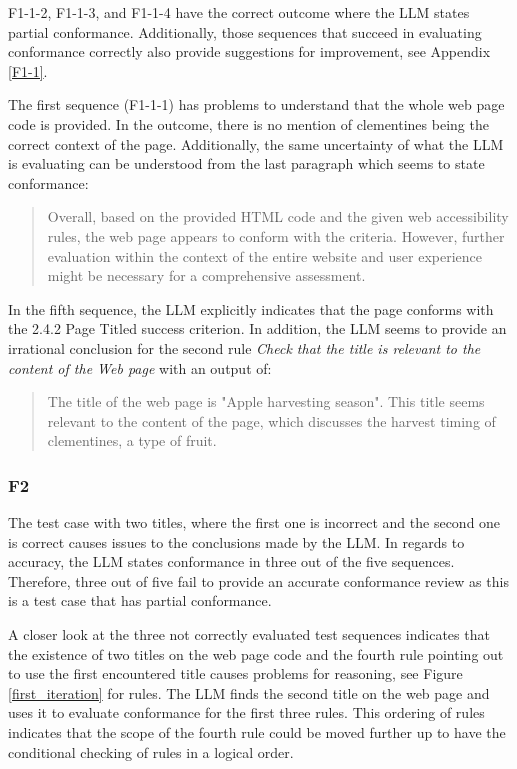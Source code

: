 F1-1-2, F1-1-3, and F1-1-4 have the correct outcome where the LLM states partial conformance. Additionally, those sequences that succeed in evaluating conformance correctly also provide suggestions for improvement, see Appendix \ref{F1-1}.

The first sequence (F1-1-1) has problems to understand that the whole web page code is provided. In the outcome, there is no mention of clementines being the correct context of the page. Additionally, the same uncertainty of what the LLM is evaluating can be understood from the last paragraph which seems to state conformance:

\blockquote{Overall, based on the provided HTML code and the given web accessibility rules, the web page appears to conform with the criteria. However, further evaluation within the context of the entire website and user experience might be necessary for a comprehensive assessment.}

In the fifth sequence, the LLM explicitly indicates that the page conforms with the 2.4.2 Page Titled success criterion. In addition, the LLM seems to provide an irrational conclusion for the second rule \textit{Check that the title is relevant to the content of the Web page} with an output of:

\blockquote{The title of the web page is "Apple harvesting season". This title seems relevant to the content of the page, which discusses the harvest timing of clementines, a type of fruit.}

\subsubsection{F2}

The test case with two titles, where the first one is incorrect and the second one is correct causes issues to the conclusions made by the LLM. In regards to accuracy, the LLM states conformance in three out of the five sequences. Therefore, three out of five fail to provide an accurate conformance review as this is a test case that has partial conformance.

A closer look at the three not correctly evaluated test sequences indicates that the existence of two titles on the web page code and the fourth rule pointing out to use the first encountered title causes problems for reasoning, see Figure \ref{first_iteration} for rules. The LLM finds the second title on the web page and uses it to evaluate conformance for the first three rules. This ordering of rules indicates that the scope of the fourth rule could be moved further up to have the conditional checking of rules in a logical order.

